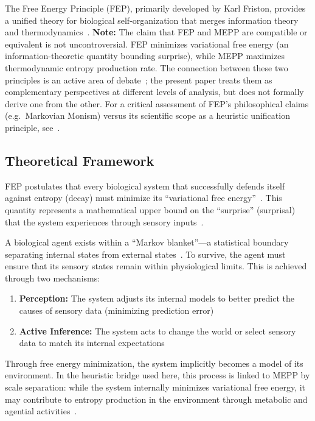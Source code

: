 \documentclass[12pt,a4paper]{article}
\theoremstyle{remark}
\begin{document}
The Free Energy Principle (FEP), primarily developed by Karl Friston, provides a unified theory for biological self-organization that merges information theory and thermodynamics~\citep{FristonFreeEnergy,FristonPDF}. \textbf{Note:} The claim that FEP and MEPP are compatible or equivalent is not uncontroversial. FEP minimizes variational free energy (an information-theoretic quantity bounding surprise), while MEPP maximizes thermodynamic entropy production rate. The connection between these two principles is an active area of debate~\citep{FristonFreeEnergy}; the present paper treats them as complementary perspectives at different levels of analysis, but does not formally derive one from the other. For a critical assessment of FEP's philosophical claims (e.g.\ Markovian Monism) versus its scientific scope as a heuristic unification principle, see~\cite{SanchezCanizares2021}.

\subsection{Theoretical Framework}

FEP postulates that every biological system that successfully defends itself against entropy (decay) must minimize its ``variational free energy''~\citep{FristonFreeEnergy}. This quantity represents a mathematical upper bound on the ``surprise'' (surprisal) that the system experiences through sensory inputs~\citep{FristonFreeEnergy}.

A biological agent exists within a ``Markov blanket''---a statistical boundary separating internal states from external states~\citep{FristonPDF}. To survive, the agent must ensure that its sensory states remain within physiological limits. This is achieved through two mechanisms:

\begin{enumerate}
    \item \textbf{Perception:} The system adjusts its internal models to better predict the causes of sensory data (minimizing prediction error)~\citep{FristonFreeEnergy}
    \item \textbf{Active Inference:} The system acts to change the world or select sensory data to match its internal expectations~\citep{FristonFreeEnergy}
\end{enumerate}

Through free energy minimization, the system implicitly becomes a model of its environment. In the heuristic bridge used here, this process is linked to MEPP by scale separation: while the system internally minimizes variational free energy, it may contribute to entropy production in the environment through metabolic and agential activities~\citep{FristonPDF}.
\end{document}
